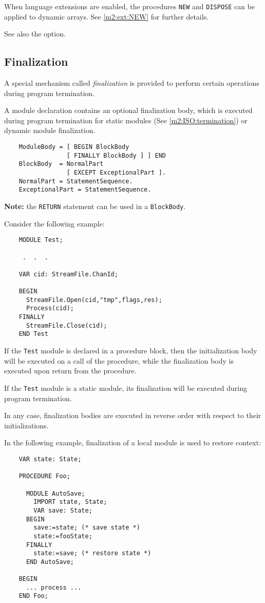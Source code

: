 When language extensions are enabled, the procedures {\tt NEW} and
{\tt DISPOSE} can be applied to dynamic arrays. See \ref{m2:ext:NEW}
for further details.

See also the  option.

\subsection{Finalization}\label{m2:ISO:final}

A special mechanism called {\em finalization} is provided to
perform certain operations during program termination.

A module declaration contains an optional finalization body, which
is executed during program termination for static modules (See
\ref{m2:ISO:termination}) or dynamic module finalization.

\begin{verbatim}
    ModuleBody = [ BEGIN BlockBody
                 [ FINALLY BlockBody ] ] END
    BlockBody  = NormalPart
                 [ EXCEPT ExceptionalPart ].
    NormalPart = StatementSequence.
    ExceptionalPart = StatementSequence.
\end{verbatim}
{\bf Note:} the \verb'RETURN' statement can be used in a {\tt BlockBody}.

Consider the following example:

\begin{verbatim}
    MODULE Test;

     .  .  .

    VAR cid: StreamFile.ChanId;

    BEGIN
      StreamFile.Open(cid,"tmp",flags,res);
      Process(cid);
    FINALLY
      StreamFile.Close(cid);
    END Test
\end{verbatim}

If the {\tt Test} module is declared in a procedure block, then
the initialization body will be executed on a call of the
procedure, while the finalization body is executed upon return
from the procedure.

If the {\tt Test} module is a static module, its finalization
will be executed during program termination.

In any case, finalization bodies are executed in reverse
order with respect to their initializations.

In the following example, finalization of a local module
is used to restore context:

\begin{verbatim}
    VAR state: State;

    PROCEDURE Foo;

      MODULE AutoSave;
        IMPORT state, State;
        VAR save: State;
      BEGIN
        save:=state; (* save state *)
        state:=fooState;
      FINALLY
        state:=save; (* restore state *)
      END AutoSave;

    BEGIN
      ... process ...
    END Foo;
\end{verbatim}

